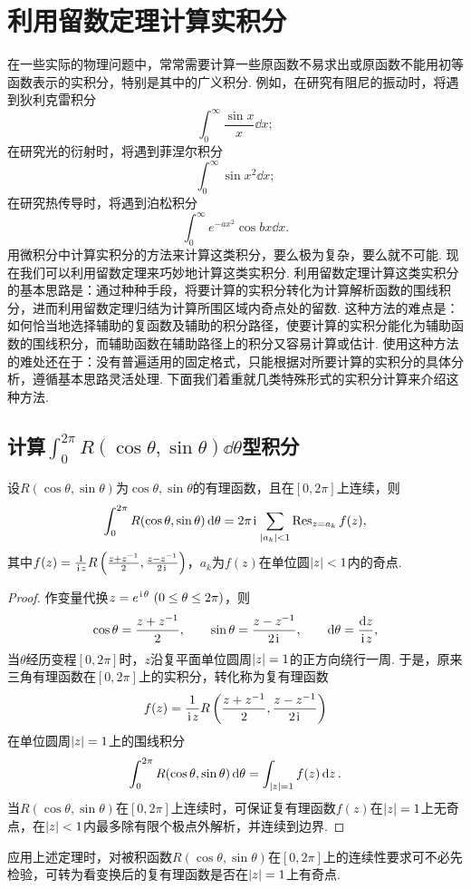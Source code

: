 \section{利用留数定理计算实积分}
在一些实际的物理问题中，常常需要计算一些原函数不易求出或原函数不能用初等函数表示的实积分，特别是其中的广义积分.
例如，在研究有阻尼的振动时，将遇到狄利克雷积分\[
\int_0^\infty \frac{\sin x}{x} \dd{x};
\]在研究光的衍射时，将遇到菲涅尔积分\[
\int_0^\infty \sin x^2 \dd{x};
\]在研究热传导时，将遇到泊松积分\[
\int_0^\infty e^{-ax^2} \cos bx \dd{x}.
\]用微积分中计算实积分的方法来计算这类积分，要么极为复杂，要么就不可能.
现在我们可以利用留数定理来巧妙地计算这类实积分.
利用留数定理计算这类实积分的基本思路是：通过种种手段，将要计算的实积分转化为计算解析函数的围线积分，进而利用留数定理归结为计算所围区域内奇点处的留数.
这种方法的难点是：如何恰当地选择辅助的复函数及辅助的积分路径，使要计算的实积分能化为辅助函数的围线积分，而辅助函数在辅助路径上的积分又容易计算或估计.
使用这种方法的难处还在于：没有普遍适用的固定格式，只能根据对所要计算的实积分的具体分析，遵循基本思路灵活处理.
下面我们着重就几类特殊形式的实积分计算来介绍这种方法.

\subsection{计算\texorpdfstring{\(\int_0^{2\pi} R(\cos\theta,\sin\theta) \dd{\theta}\)型}{在[0,2π]区间上的含有三角函数的}积分}
\begin{theorem}\label{theorem:留数定理.利用留数定理计算实积分1}
设\(R(\cos\theta,\sin\theta)\)为\(\cos\theta,\sin\theta\)的有理函数，且在\([0,2\pi]\)上连续，则\[
\int_0^{2\pi} R(\cos\theta,\sin\theta) \dd{\theta}
= 2\pi\kern1pt\mathrm{i}\kern1pt \sum_{\abs{a_k}<1} \operatorname{Res}_{z=a_k} f(z),
\]其中\(f(z) = \frac{1}{\kern1pt\mathrm{i}\kern1pt z} R\left(\frac{z+z^{-1}}{2},\frac{z-z^{-1}}{2\kern1pt\mathrm{i}\kern1pt}\right)\)，\(a_k\)为\(f(z)\)在单位圆\(\abs{z}<1\)内的奇点.
\begin{proof}
作变量代换\(z = e^{\kern1pt\mathrm{i}\kern1pt\theta}\ (0\leq\theta\leq2\pi)\)，则\[
\cos\theta = \frac{z+z^{-1}}{2},
\qquad
\sin\theta = \frac{z-z^{-1}}{2\kern1pt\mathrm{i}\kern1pt},
\qquad
\dd{\theta} = \frac{\dd{z}}{\kern1pt\mathrm{i}\kern1pt z},
\]当\(\theta\)经历变程\([0,2\pi]\)时，\(z\)沿复平面单位圆周\(\abs{z}=1\)的正方向绕行一周.
于是，原来三角有理函数在\([0,2\pi]\)上的实积分，转化称为复有理函数\[
f(z) = \frac{1}{\kern1pt\mathrm{i}\kern1pt z} R\left(\frac{z+z^{-1}}{2},\frac{z-z^{-1}}{2\kern1pt\mathrm{i}\kern1pt}\right)
\]在单位圆周\(\abs{z}=1\)上的围线积分\[
\int_0^{2\pi} R(\cos\theta,\sin\theta) \dd{\theta}
= \int_{\abs{z}=1} f(z) \dd{z}.
\]当\(R(\cos\theta,\sin\theta)\)在\([0,2\pi]\)上连续时，可保证复有理函数\(f(z)\)在\(\abs{z}=1\)上无奇点，在\(\abs{z}<1\)内最多除有限个极点外解析，并连续到边界.
\end{proof}
\end{theorem}
应用上述定理时，对被积函数\(R(\cos\theta,\sin\theta)\)在\([0,2\pi]\)上的连续性要求可不必先检验，可转为看变换后的复有理函数是否在\(\abs{z}=1\)上有奇点.

